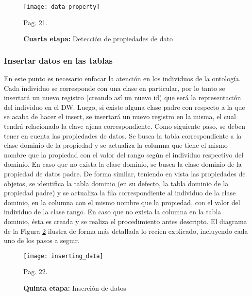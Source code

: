 \documentclass[a4paper,11pt]{article}
\begin{document}
    \begin{figure}[!htb]
      \begin{center}
        \texttt{[image: data\_property]}
        \caption{\textbf{Cuarta etapa:} Detección de propiedades de dato} \cite{ontologias} Pag. 21.
        \label{dataProperty}
      \end{center}
    \end{figure}
    
    
    \subsubsection{Insertar datos en las tablas}
    
    En este punto es necesario enfocar la atención en los individuos de la ontología. Cada individuo se corresponde con una clase en particular, por lo tanto se
    insertará un nuevo registro (creando así un nuevo id) que será la representación del individuo en el DW. Luego, si existe alguna clase padre con respecto a la
    que se acaba de hacer el insert, se insertará un nuevo registro en la misma, el cual tendrá relacionado la clave ajena correspondiente. Como siguiente paso,
    se deben tener en cuenta las propiedades de datos. Se busca la tabla correspondiente a la clase dominio de la propiedad y se actualiza la columna que tiene el
    mismo nombre que la propiedad con el valor del rango según el individuo respectivo del dominio. En caso que no exista la clase dominio, se busca la clase
    dominio de la propiedad de datos padre. De forma similar, teniendo en vista las propiedades de objetos,  se identifica la tabla dominio (en su defecto, la 
    tabla dominio de la propiedad padre) y se actualiza la fila correspondiente al individuo de la clase dominio, en la columna con el mismo nombre que la
    propiedad, con el valor del individuo de la clase rango. En caso que no exista la columna en la tabla dominio, ésta es creada y se realiza el procedimiento
    antes descripto. El diagrama de la Figura \ref{insertingData} ilustra de forma más detallada lo recien explicado, incluyendo cada uno de los pasos a seguir.
    
    \begin{figure}[!htb]
      \begin{center}
        \texttt{[image: inserting\_data]}
        \caption{\textbf{Quinta etapa:} Inserción de datos} \cite{ontologias} Pag. 22.
        \label{insertingData}
      \end{center}
    \end{figure}
    
\end{document}
